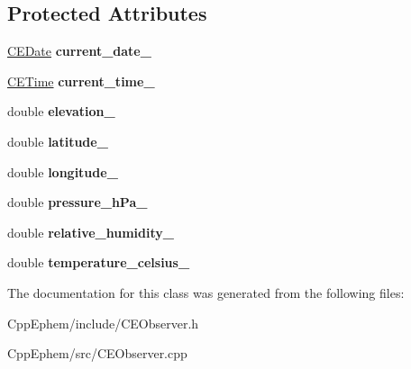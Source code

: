\subsection*{Protected Attributes}
\begin{DoxyCompactItemize}
\item 
\hypertarget{class_c_e_observer_aa1ab88ae5f08deba1fccb5d30502300d}{}\hyperlink{class_c_e_date}{C\+E\+Date} {\bfseries current\+\_\+date\+\_\+}\label{class_c_e_observer_aa1ab88ae5f08deba1fccb5d30502300d}

\item 
\hypertarget{class_c_e_observer_ab0148e7d53a311c489ed8094007a2ea6}{}\hyperlink{class_c_e_time}{C\+E\+Time} {\bfseries current\+\_\+time\+\_\+}\label{class_c_e_observer_ab0148e7d53a311c489ed8094007a2ea6}

\item 
\hypertarget{class_c_e_observer_accfa8a32945d78ce4d17378be68ef364}{}double {\bfseries elevation\+\_\+}\label{class_c_e_observer_accfa8a32945d78ce4d17378be68ef364}

\item 
\hypertarget{class_c_e_observer_a30235a99b3b715fb1e4381d4a1f5837d}{}double {\bfseries latitude\+\_\+}\label{class_c_e_observer_a30235a99b3b715fb1e4381d4a1f5837d}

\item 
\hypertarget{class_c_e_observer_ac76c0ef9070cf96db45b5196b481dadc}{}double {\bfseries longitude\+\_\+}\label{class_c_e_observer_ac76c0ef9070cf96db45b5196b481dadc}

\item 
\hypertarget{class_c_e_observer_a566c7f1ab1e66968981b52d4bd694474}{}double {\bfseries pressure\+\_\+h\+Pa\+\_\+}\label{class_c_e_observer_a566c7f1ab1e66968981b52d4bd694474}

\item 
\hypertarget{class_c_e_observer_a1517a290b142b72e5f82a5a42bc9f565}{}double {\bfseries relative\+\_\+humidity\+\_\+}\label{class_c_e_observer_a1517a290b142b72e5f82a5a42bc9f565}

\item 
\hypertarget{class_c_e_observer_ac29e9479df58bd3bed6d4b749747b2bd}{}double {\bfseries temperature\+\_\+celsius\+\_\+}\label{class_c_e_observer_ac29e9479df58bd3bed6d4b749747b2bd}

\end{DoxyCompactItemize}


The documentation for this class was generated from the following files\+:\begin{DoxyCompactItemize}
\item 
Cpp\+Ephem/include/C\+E\+Observer.\+h\item 
Cpp\+Ephem/src/C\+E\+Observer.\+cpp\end{DoxyCompactItemize}
